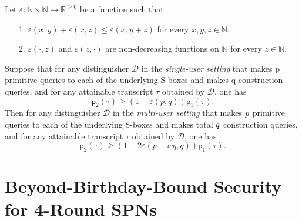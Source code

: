 \documentclass[journal=tosc,final,nohyperref]{iacrtrans}
\begin{document}
\begin{lemma}
	\label{lemma:point-wise}
	
	Let $\varepsilon : \mathbb{N} \times \mathbb{N} \rightarrow \mathbb{R}^{\geq 0}$ be a function such that
	\begin{itemize}
		\item[1.] $\varepsilon (x, y) + \varepsilon (x, z) \leq \varepsilon (x, y + z)$ for every $x, y, z \in \mathbb{N}$,
		\item[2.] $\varepsilon (\cdot, z)$ and $\varepsilon (z, \cdot)$ are non-decreasing functions on $\mathbb{N}$ for every $z \in \mathbb{N}$.
	\end{itemize}
	Suppose that for any distinguisher $\mathcal{D}$ in the {\it single-user setting} that makes p primitive queries to each of the underlying S-boxes and makes q construction queries, and for any attainable transcript $\tau$ obtained by $\mathcal{D}$, one has
	$$
	\mathsf{p}_{2}(\tau) \geq (1 - \varepsilon(p,q)) \mathsf{p}_{1}(\tau).
	$$
	Then for any distinguisher $\mathcal{D}$ in the {\it multi-user setting} that makes $\mathnormal{p}$ primitive queries to each of the underlying S-boxes and makes total $\mathnormal{q}$ construction queries, and for any attainable transcript $\tau$ obtained by $\mathcal{D}$, one has
	$$
	\mathsf{p}_{2}(\tau) \geq (1 - 2 \varepsilon(p + wq,q)) \mathsf{p}_{1}(\tau).
	$$
\end{lemma}



%
%
%
%
%
%






\section{Beyond-Birthday-Bound Security for 4-Round SPNs}
\label{section:security of 4-round SPNs}
\end{document}
